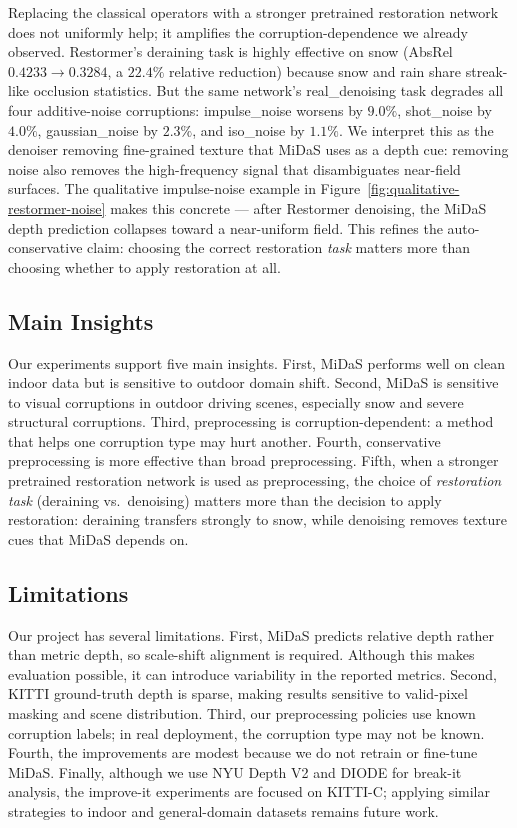 \documentclass[10pt]{article}
\begin{document}
Replacing the classical operators with a stronger pretrained restoration network does not uniformly help; it amplifies the corruption-dependence we already observed. Restormer's deraining task is highly effective on snow (AbsRel $0.4233 \rightarrow 0.3284$, a $22.4\%$ relative reduction) because snow and rain share streak-like occlusion statistics. But the same network's real\_denoising task degrades all four additive-noise corruptions: impulse\_noise worsens by $9.0\%$, shot\_noise by $4.0\%$, gaussian\_noise by $2.3\%$, and iso\_noise by $1.1\%$. We interpret this as the denoiser removing fine-grained texture that MiDaS uses as a depth cue: removing noise also removes the high-frequency signal that disambiguates near-field surfaces. The qualitative impulse-noise example in Figure~\ref{fig:qualitative-restormer-noise} makes this concrete --- after Restormer denoising, the MiDaS depth prediction collapses toward a near-uniform field. This refines the auto-conservative claim: choosing the correct restoration \emph{task} matters more than choosing whether to apply restoration at all.

\subsection{Main Insights}

Our experiments support five main insights. First, MiDaS performs well on clean indoor data but is sensitive to outdoor domain shift. Second, MiDaS is sensitive to visual corruptions in outdoor driving scenes, especially snow and severe structural corruptions. Third, preprocessing is corruption-dependent: a method that helps one corruption type may hurt another. Fourth, conservative preprocessing is more effective than broad preprocessing. Fifth, when a stronger pretrained restoration network is used as preprocessing, the choice of \emph{restoration task} (deraining vs.\ denoising) matters more than the decision to apply restoration: deraining transfers strongly to snow, while denoising removes texture cues that MiDaS depends on.

\subsection{Limitations}

Our project has several limitations. First, MiDaS predicts relative depth rather than metric depth, so scale-shift alignment is required. Although this makes evaluation possible, it can introduce variability in the reported metrics. Second, KITTI ground-truth depth is sparse, making results sensitive to valid-pixel masking and scene distribution. Third, our preprocessing policies use known corruption labels; in real deployment, the corruption type may not be known. Fourth, the improvements are modest because we do not retrain or fine-tune MiDaS. Finally, although we use NYU Depth V2 and DIODE for break-it analysis, the improve-it experiments are focused on KITTI-C; applying similar strategies to indoor and general-domain datasets remains future work.
\end{document}
